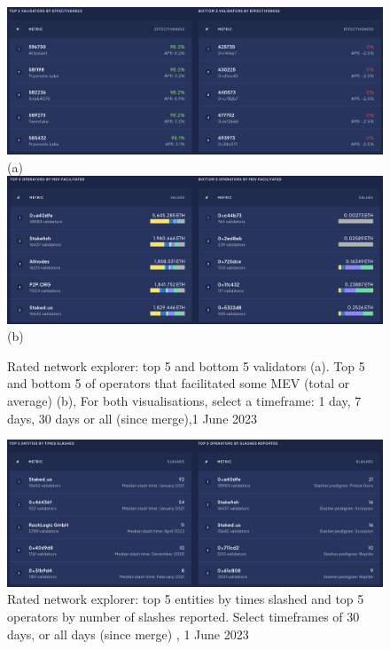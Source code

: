 \documentclass[UTF8]{article}
\begin{document}
\begin{figure}[htbp]
\begin{center}
\includegraphics[width=\linewidth]{images/ratedtrend3}\\
(a)
\includegraphics[width=\linewidth]{images/ratedtrend4}\\
(b)
\caption{Rated network explorer: top 5 and bottom 5 validators (a).  Top 5 and bottom 5 of operators that facilitated some MEV (total or average) (b), For both visualisations, select a timeframe: 1 day, 7 days, 30 days or all (since merge),1 June 2023}
\label{fig:ratedtrend4}
\end{center}
\end{figure}

\begin{figure}[htbp]
\begin{center}
\includegraphics[width=\linewidth]{images/ratedtrend5}
\caption{Rated network explorer: top 5 entities by times slashed and top 5 operators by number of slashes reported. Select timeframes of 30 days, or all days (since merge) , 1 June 2023}
\label{fig:ratedtrend5}
\end{center}
\end{figure}
\end{document}
